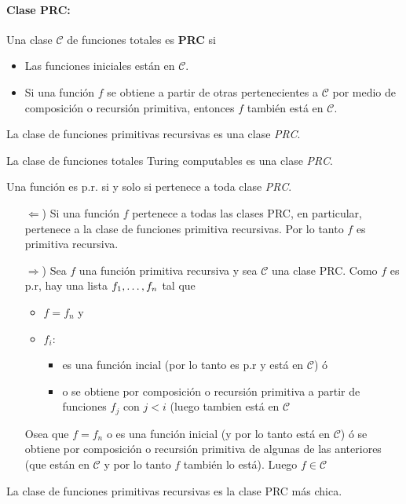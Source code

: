 	\paragraph{Clase PRC:}	Una clase $\mathcal{C}$ de funciones totales es \textbf{PRC} si
	\begin{itemize}
		\item Las funciones iniciales están en $\mathcal{C}$.
		\item Si una función $f$ se obtiene a partir de otras pertenecientes a $\mathcal{C}$ por medio de composición o recursión primitiva, entonces $f$ también está en $\mathcal{C}$.
	\end{itemize}

	\begin{corolario}
La clase de funciones primitivas recursivas es una clase \textit{PRC}.
	\end{corolario}
	
	\begin{teorema}
La clase de funciones totales Turing computables es una clase \textit{PRC}.
	\end{teorema}
	\newtheorem{prEsPrSiiEstaEnC}{Teorema}[section]
	\begin{teorema}
Una función es p.r. si y solo si pertenece a toda clase \textit{PRC}.
	\end{teorema}
	
	\begin{demo}
		\begin{itemize}
			\item[$\Leftarrow$)] Si una función $f$ pertenece a todas las clases PRC, en particular, pertenece a la clase de funciones primitiva recursivas. Por lo tanto $f$ es primitiva recursiva.
			\item[$\Rightarrow$)] Sea $f$ una función primitiva recursiva y sea $\mathcal{C}$ una clase PRC. Como $f$ es p.r, hay una lista $f_1,\dots, f_{n}$
			tal que
			\begin{itemize}
				\item $f = f_n$ y
				\item $f_i$:
				\begin{itemize}
				\item es una función incial (por lo tanto es p.r y está en $\mathcal{C}$) ó
				\item o se obtiene por composición o recursión primitiva a partir de funciones $f_j$ con $j < i$ (luego tambien está en $\mathcal{C}$
				\end{itemize}
			\end{itemize}
			Osea que $f=f_n$ o es una función inicial (y por lo tanto está en $\mathcal{C}$) ó se obtiene por composición o recursión primitiva de algunas de las anteriores (que están en $\mathcal{C}$ y por lo tanto $f$ también lo está). Luego $f\in\mathcal{C}$
		\end{itemize}
	\end{demo}
	\begin{corolario}
La clase de funciones primitivas recursivas es la clase PRC más chica.
	\end{corolario}
	
